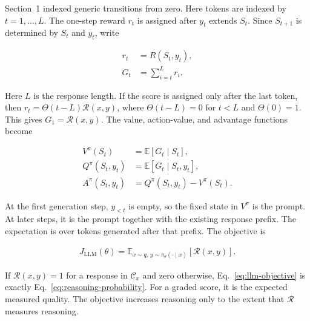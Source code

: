\documentclass[11pt]{article}
\newcommand{\E}{\mathbb{E}}
\begin{document}
Section~1 indexed generic transitions from zero.  Here tokens are indexed by
\(t=1,\ldots,L\).  The one-step reward \(r_t\) is assigned after \(y_t\)
extends \(S_t\).  Since \(S_{t+1}\) is determined by \(S_t\) and \(y_t\),
write

\begin{equation}
    \begin{split}
        r_t&=R(S_t,y_t),\\
        G_t&=\sum_{i=t}^{L}r_i.
    \end{split}
    \label{eq:llm-token-reward}
\end{equation}

Here \(L\) is the response length.  If the score is assigned only after the
last token, then \(r_t=\Theta(t-L)\mathcal R(x,y)\), where
\(\Theta(t-L)=0\) for \(t<L\) and \(\Theta(0)=1\).  This gives
\(G_1=\mathcal R(x,y)\).  The value, action-value, and advantage functions
become

\begin{equation}
    \begin{split}
        V^\pi(S_t)
          &=\E\left[G_t\mid S_t\right],\\
        Q^\pi(S_t,y_t)
          &=\E\left[G_t\mid S_t,y_t\right],\\
        A^\pi(S_t,y_t)
          &=Q^\pi(S_t,y_t)-V^\pi(S_t).
    \end{split}
    \label{eq:llm-value-map}
\end{equation}

At the first generation step, \(y_{<t}\) is empty, so the fixed state in
\(V^\pi\) is the prompt.  At later steps, it is the prompt together with the
existing response prefix.  The expectation is over tokens generated after
that prefix.  The objective is

\begin{equation}
    \begin{split}
        J_{\mathrm{LLM}}(\theta)
          =\E_{x\sim q,\,y\sim\pi_\theta(\cdot\mid x)}
           \left[\mathcal R(x,y)\right].
    \end{split}
    \label{eq:llm-objective}
\end{equation}

If \(\mathcal R(x,y)=1\) for a response in \(\mathcal C_x\) and zero
otherwise, Eq.~\eqref{eq:llm-objective} is exactly
Eq.~\eqref{eq:reasoning-probability}.  For a graded score, it is the expected
measured quality.  The objective increases reasoning only to the extent that
\(\mathcal R\) measures reasoning.
\end{document}
